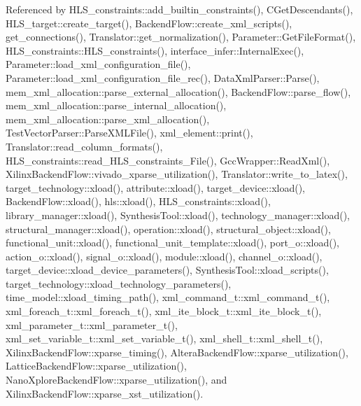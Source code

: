 Referenced by H\+L\+S\+\_\+constraints\+::add\+\_\+builtin\+\_\+constraints(), C\+Get\+Descendants(), H\+L\+S\+\_\+target\+::create\+\_\+target(), Backend\+Flow\+::create\+\_\+xml\+\_\+scripts(), get\+\_\+connections(), Translator\+::get\+\_\+normalization(), Parameter\+::\+Get\+File\+Format(), H\+L\+S\+\_\+constraints\+::\+H\+L\+S\+\_\+constraints(), interface\+\_\+infer\+::\+Internal\+Exec(), Parameter\+::load\+\_\+xml\+\_\+configuration\+\_\+file(), Parameter\+::load\+\_\+xml\+\_\+configuration\+\_\+file\+\_\+rec(), Data\+Xml\+Parser\+::\+Parse(), mem\+\_\+xml\+\_\+allocation\+::parse\+\_\+external\+\_\+allocation(), Backend\+Flow\+::parse\+\_\+flow(), mem\+\_\+xml\+\_\+allocation\+::parse\+\_\+internal\+\_\+allocation(), mem\+\_\+xml\+\_\+allocation\+::parse\+\_\+xml\+\_\+allocation(), Test\+Vector\+Parser\+::\+Parse\+X\+M\+L\+File(), xml\+\_\+element\+::print(), Translator\+::read\+\_\+column\+\_\+formats(), H\+L\+S\+\_\+constraints\+::read\+\_\+\+H\+L\+S\+\_\+constraints\+\_\+\+File(), Gcc\+Wrapper\+::\+Read\+Xml(), Xilinx\+Backend\+Flow\+::vivado\+\_\+xparse\+\_\+utilization(), Translator\+::write\+\_\+to\+\_\+latex(), target\+\_\+technology\+::xload(), attribute\+::xload(), target\+\_\+device\+::xload(), Backend\+Flow\+::xload(), hls\+::xload(), H\+L\+S\+\_\+constraints\+::xload(), library\+\_\+manager\+::xload(), Synthesis\+Tool\+::xload(), technology\+\_\+manager\+::xload(), structural\+\_\+manager\+::xload(), operation\+::xload(), structural\+\_\+object\+::xload(), functional\+\_\+unit\+::xload(), functional\+\_\+unit\+\_\+template\+::xload(), port\+\_\+o\+::xload(), action\+\_\+o\+::xload(), signal\+\_\+o\+::xload(), module\+::xload(), channel\+\_\+o\+::xload(), target\+\_\+device\+::xload\+\_\+device\+\_\+parameters(), Synthesis\+Tool\+::xload\+\_\+scripts(), target\+\_\+technology\+::xload\+\_\+technology\+\_\+parameters(), time\+\_\+model\+::xload\+\_\+timing\+\_\+path(), xml\+\_\+command\+\_\+t\+::xml\+\_\+command\+\_\+t(), xml\+\_\+foreach\+\_\+t\+::xml\+\_\+foreach\+\_\+t(), xml\+\_\+ite\+\_\+block\+\_\+t\+::xml\+\_\+ite\+\_\+block\+\_\+t(), xml\+\_\+parameter\+\_\+t\+::xml\+\_\+parameter\+\_\+t(), xml\+\_\+set\+\_\+variable\+\_\+t\+::xml\+\_\+set\+\_\+variable\+\_\+t(), xml\+\_\+shell\+\_\+t\+::xml\+\_\+shell\+\_\+t(), Xilinx\+Backend\+Flow\+::xparse\+\_\+timing(), Altera\+Backend\+Flow\+::xparse\+\_\+utilization(), Lattice\+Backend\+Flow\+::xparse\+\_\+utilization(), Nano\+Xplore\+Backend\+Flow\+::xparse\+\_\+utilization(), and Xilinx\+Backend\+Flow\+::xparse\+\_\+xst\+\_\+utilization().

